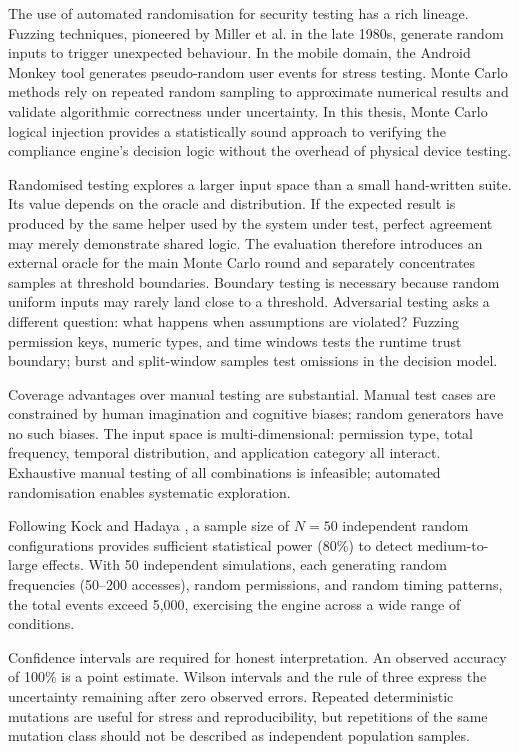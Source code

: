 The use of automated randomisation for security testing has a rich lineage. Fuzzing techniques, pioneered by Miller et al. in the late 1980s, generate random inputs to trigger unexpected behaviour. In the mobile domain, the Android Monkey tool generates pseudo-random user events for stress testing. Monte Carlo methods rely on repeated random sampling to approximate numerical results and validate algorithmic correctness under uncertainty. In this thesis, Monte Carlo logical injection provides a statistically sound approach to verifying the compliance engine's decision logic without the overhead of physical device testing.

Randomised testing explores a larger input space than a small hand-written suite. Its value depends on the oracle and distribution. If the expected result is produced by the same helper used by the system under test, perfect agreement may merely demonstrate shared logic. The evaluation therefore introduces an external oracle for the main Monte Carlo round and separately concentrates samples at threshold boundaries. Boundary testing is necessary because random uniform inputs may rarely land close to a threshold. Adversarial testing asks a different question: what happens when assumptions are violated? Fuzzing permission keys, numeric types, and time windows tests the runtime trust boundary; burst and split-window samples test omissions in the decision model.

Coverage advantages over manual testing are substantial. Manual test cases are constrained by human imagination and cognitive biases; random generators have no such biases. The input space is multi-dimensional: permission type, total frequency, temporal distribution, and application category all interact. Exhaustive manual testing of all combinations is infeasible; automated randomisation enables systematic exploration.

Following Kock and Hadaya \cite{47}, a sample size of \(N=50\) independent random configurations provides sufficient statistical power (80\%) to detect medium-to-large effects. With 50 independent simulations, each generating random frequencies (50--200 accesses), random permissions, and random timing patterns, the total events exceed 5,000, exercising the engine across a wide range of conditions.

Confidence intervals are required for honest interpretation. An observed accuracy of 100\% is a point estimate. Wilson intervals and the rule of three express the uncertainty remaining after zero observed errors. Repeated deterministic mutations are useful for stress and reproducibility, but repetitions of the same mutation class should not be described as independent population samples.

